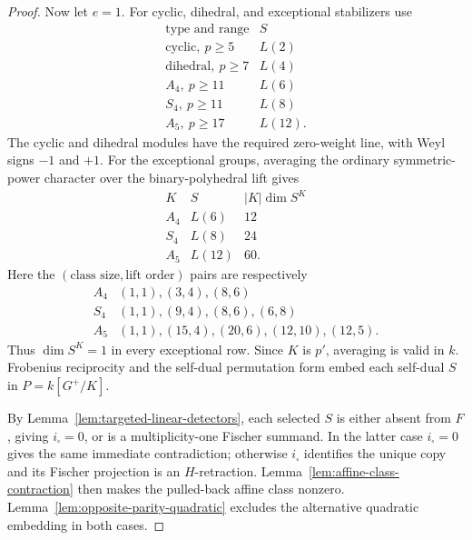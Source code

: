 \documentclass[11pt]{article}
\theoremstyle{definition}
\theoremstyle{remark}
\begin{document}
\begin{proof}
Now let \(e=1\).  For cyclic, dihedral, and exceptional stabilizers use
\[
\begin{array}{c|c}
\text{type and range}&S\\ \hline
\text{cyclic},\ p\ge5&L(2)\\
\text{dihedral},\ p\ge7&L(4)\\
A_4,\ p\ge11&L(6)\\
S_4,\ p\ge11&L(8)\\
A_5,\ p\ge17&L(12).
\end{array}                                                \tag{3.2f}
\]
The cyclic and dihedral modules have the required zero-weight line, with
Weyl signs \(-1\) and \(+1\).  For the exceptional groups, averaging the
ordinary symmetric-power character over the binary-polyhedral lift gives
\[
\begin{array}{c|c|c}
K&S&|K|\dim S^K\\ \hline
A_4&L(6)&12\\
S_4&L(8)&24\\
A_5&L(12)&60.
\end{array}
\]
Here the \((\text{class size},\text{lift order})\) pairs are respectively
\[
\begin{array}{c|l}
A_4&(1,1),(3,4),(8,6)\\
S_4&(1,1),(9,4),(8,6),(6,8)\\
A_5&(1,1),(15,4),(20,6),(12,10),(12,5).
\end{array}
\]
Thus \(\dim S^K=1\) in every exceptional row.  Since \(K\) is \(p'\),
averaging is valid in \(k\).  Frobenius reciprocity and the self-dual
permutation form embed each self-dual \(S\) in \(P=k[G^+/K]\).

By Lemma~\ref{lem:targeted-linear-detectors}, each selected \(S\) is either
absent from \(F\), giving \(i_\square=0\), or is a multiplicity-one Fischer
summand.  In the latter case \(i_\square=0\) gives the same immediate
contradiction; otherwise \(i_\square\) identifies the unique copy and its
Fischer projection is an \(H\)-retraction.
Lemma~\ref{lem:affine-class-contraction} then makes the pulled-back affine
class nonzero.  Lemma~\ref{lem:opposite-parity-quadratic} excludes the
alternative quadratic embedding in both cases.


\end{proof}
\end{document}
